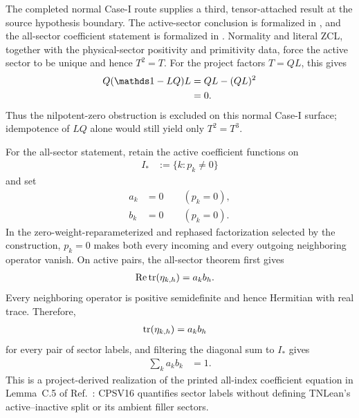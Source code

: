 \documentclass{article}
\begin{document}
The completed normal Case-I route supplies a third, tensor-attached result at
the source hypothesis boundary. The active-sector conclusion is formalized in
,
and the all-sector coefficient statement is formalized in
.
Normality and literal ZCL, together with the physical-sector positivity and
primitivity data, force the active sector to be unique and hence $T^2=T$. For
the project factors $T=QL$, this gives
\begin{align}
    Q(\Id-LQ)L
        &= QL-(QL)^2
    \label{eq:cpgsv17_normal_case_remainder_difference}\\
        &= 0.
    \label{eq:cpgsv17_normal_case_remainder_vanishing}
\end{align}
Thus the nilpotent-zero obstruction is excluded on this normal Case-I surface;
idempotence of $LQ$ alone would still yield only $T^2=T^3$.

For the all-sector statement, retain the active coefficient functions on
\begin{align}
    I_*
        &:= \{k:p_k\neq 0\}
    \label{eq:cpgsv17_active_index_set}
\end{align}
and set
\begin{align}
    a_k
        &= 0
        \qquad (p_k=0),
    \label{eq:cpgsv17_inactive_left_coefficient}\\
    b_k
        &= 0
        \qquad (p_k=0).
    \label{eq:cpgsv17_inactive_right_coefficient}
\end{align}
In the zero-weight-reparameterized and rephased factorization selected by the
construction, $p_k=0$ makes both every incoming and every outgoing neighboring
operator vanish. On active pairs, the all-sector theorem first gives
\begin{align}
    \operatorname{Re}\operatorname{tr}(\eta_{k,h})
        &= a_kb_h.
    \label{eq:cpgsv17_active_real_neighboring_trace}
\end{align}
Every neighboring operator is positive semidefinite and hence Hermitian with
real trace. Therefore,
\begin{align}
    \operatorname{tr}(\eta_{k,h})
        &= a_kb_h
    \label{eq:cpgsv17_all_sector_complex_trace_factorization}
\end{align}
for every pair of sector labels, and filtering the diagonal sum to $I_*$ gives
\begin{align}
    \sum_k a_kb_k
        &= 1.
    \label{eq:cpgsv17_all_sector_coefficient_normalization}
\end{align}
This is a project-derived realization of the printed all-index coefficient
equation in Lemma~C.5 of Ref.~\cite{Cirac2016MPDO_arXiv}: CPSV16 quantifies
sector labels without defining TNLean's active--inactive split or its ambient
filler sectors.
\end{document}
